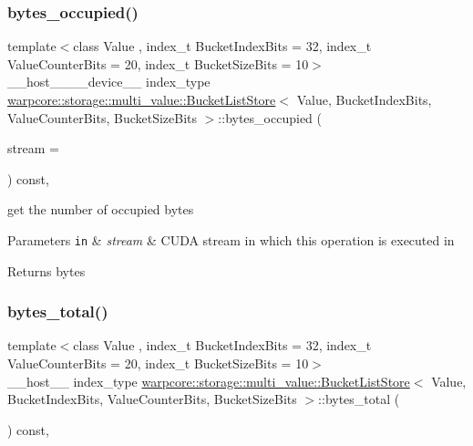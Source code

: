 \subsubsection{\texorpdfstring{bytes\+\_\+occupied()}{bytes\_occupied()}}
{\footnotesize\ttfamily template$<$class Value , index\+\_\+t Bucket\+Index\+Bits = 32, index\+\_\+t Value\+Counter\+Bits = 20, index\+\_\+t Bucket\+Size\+Bits = 10$>$ \\
\+\_\+\+\_\+host\+\_\+\+\_\+\+\_\+\+\_\+device\+\_\+\+\_\+ index\+\_\+type \hyperlink{classwarpcore_1_1storage_1_1multi__value_1_1BucketListStore}{warpcore\+::storage\+::multi\+\_\+value\+::\+Bucket\+List\+Store}$<$ Value, Bucket\+Index\+Bits, Value\+Counter\+Bits, Bucket\+Size\+Bits $>$\+::bytes\+\_\+occupied (\begin{DoxyParamCaption}\item[{const cuda\+Stream\+\_\+t}]{stream = {} }\end{DoxyParamCaption}) const\hspace{0.3cm}{\ttfamily [inline]}, {\ttfamily [noexcept]}}



get the number of occupied bytes 


\begin{DoxyParams}[1]{Parameters}
\mbox{\tt in}  & {\em stream} & C\+U\+DA stream in which this operation is executed in \\
\hline
\end{DoxyParams}
\begin{DoxyReturn}{Returns}
bytes 
\end{DoxyReturn}
\mbox{\label{classwarpcore_1_1storage_1_1multi__value_1_1BucketListStore_a42c56265d7617fd305690e14bda34bad}} 
\subsubsection{\texorpdfstring{bytes\+\_\+total()}{bytes\_total()}}
{\footnotesize\ttfamily template$<$class Value , index\+\_\+t Bucket\+Index\+Bits = 32, index\+\_\+t Value\+Counter\+Bits = 20, index\+\_\+t Bucket\+Size\+Bits = 10$>$ \\
\+\_\+\+\_\+host\+\_\+\+\_\+ index\+\_\+type \hyperlink{classwarpcore_1_1storage_1_1multi__value_1_1BucketListStore}{warpcore\+::storage\+::multi\+\_\+value\+::\+Bucket\+List\+Store}$<$ Value, Bucket\+Index\+Bits, Value\+Counter\+Bits, Bucket\+Size\+Bits $>$\+::bytes\+\_\+total (\begin{DoxyParamCaption}{ }\end{DoxyParamCaption}) const\hspace{0.3cm}{\ttfamily [inline]}, {\ttfamily [noexcept]}}



